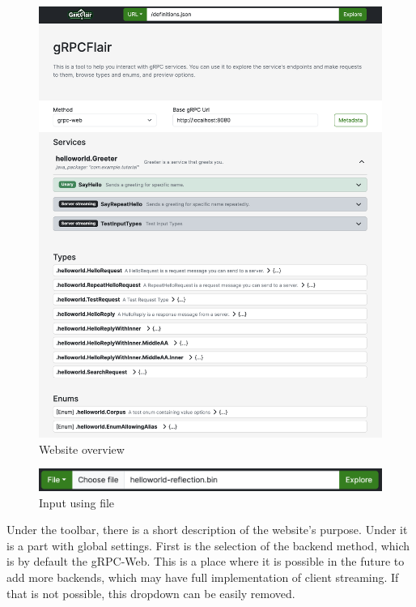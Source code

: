 \begin{figure}[hbt!]
    \centering
    \captionsetup{justification=centering}
    \includegraphics[width=1.0\textwidth]{images/implementation/screenshots/fullpage}
    \caption{Website overview}
    \label{fig:implementation-screenshots-fullpage}
\end{figure}

\begin{figure}[hbt!]
    \centering
    \captionsetup{justification=centering}
    \includegraphics[width=1.0\textwidth]{images/implementation/screenshots/reflection-input}
    \caption{Input using file}
    \label{fig:implementation-screenshots-reflection-input}
\end{figure}

Under the toolbar, there is a short description of the website's purpose.
Under it is a part with global settings.
First is the selection of the backend method, which is by default the gRPC-Web.
This is a place where it is possible in the future to add more backends, which may have full implementation of client streaming.
If that is not possible, this dropdown can be easily removed.

